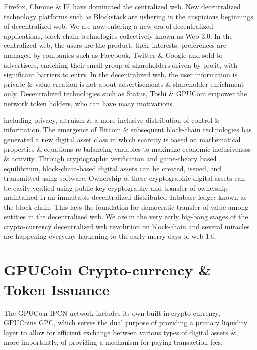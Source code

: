 \documentclass{article}
\begin{document}


Firefox, Chrome \& IE have dominated the centralized web. New decentralized technology platforms such as Blockstack are ushering in the auspicious beginnings of decentralized web. 
We are now entering a new era of decentralized applications, block-chain technologies collectively known as Web 3.0. In the centralized web, the users are the product, their interests, preferences are managed
 by companies such as Facebook, Twitter \& Google and sold to advertisers, enriching their small group of shareholders driven by profit, with significant barriers to entry. In the
decentralized web, the user information is private \& value creation is not about advertisements \& shareholder enrichment only. Decentralized
technologies such as Status, Toshi \& GPUCoin empower the network token holders, who can have many motivations 

 including privacy, altruism \& a more inclusive distribution of control \& information. The emergence of Bitcoin \& subsequent block-chain technologies has generated a new digital asset class in which scarcity is based on mathematical properties \& equations re-balancing variables to maximize economic inclusiveness \& activity. Through cryptographic verification and game-theory based equilibrium, block-chain-based digital assets can be created, issued, and transmitted using software. Ownership of these cryptographic digital assets can be easily verified using public key cryptography and transfer of ownership maintained in an immutable decentralized distributed database ledger known as the block-chain. This lays the foundation for democratic transfer of value among entities in the decentralized web.
We are in the very early big-bang stages of the crypto-currency decentralized web revolution on block-chain and several miracles are happening everyday harkening to the early merry days of web 1.0.

\section{GPUCoin Crypto-currency \& Token Issuance}

The GPUCoin IPCN network includes its own built-in crypto-currency, GPUCoins GPC, which serves the dual purpose of providing a primary liquidity layer to allow for efficient exchange between various types of digital assets \&, more importantly, of providing a mechanism for paying transaction fees.
\end{document}
